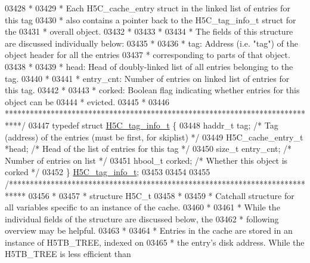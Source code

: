 \begin{DoxyCode}
03428 \textcolor{comment}{ *}
03429 \textcolor{comment}{ * Each H5C\_cache\_entry struct in the linked list of entries for this tag}
03430 \textcolor{comment}{ *      also contains a pointer back to the H5C\_tag\_info\_t struct for the}
03431 \textcolor{comment}{ *      overall object.}
03432 \textcolor{comment}{ *}
03433 \textcolor{comment}{ *}
03434 \textcolor{comment}{ * The fields of this structure are discussed individually below:}
03435 \textcolor{comment}{ *}
03436 \textcolor{comment}{ * tag: Address (i.e. "tag") of the object header for all the entries}
03437 \textcolor{comment}{ *              corresponding to parts of that object.}
03438 \textcolor{comment}{ *}
03439 \textcolor{comment}{ * head: Head of doubly-linked list of all entries belonging to the tag.}
03440 \textcolor{comment}{ *}
03441 \textcolor{comment}{ * entry\_cnt: Number of entries on linked list of entries for this tag.}
03442 \textcolor{comment}{ *}
03443 \textcolor{comment}{ * corked: Boolean flag indicating whether entries for this object can be}
03444 \textcolor{comment}{ *      evicted.}
03445 \textcolor{comment}{ *}
03446 \textcolor{comment}{ ****************************************************************************/}
03447 \textcolor{keyword}{typedef} \textcolor{keyword}{struct }\hyperlink{struct_h5_c__tag__info__t}{H5C\_tag\_info\_t} \{
03448     haddr\_t tag;                \textcolor{comment}{/* Tag (address) of the entries (must be first, for skiplist) */}
03449     H5C\_cache\_entry\_t *head;    \textcolor{comment}{/* Head of the list of entries for this tag */}
03450     \textcolor{keywordtype}{size\_t} entry\_cnt;           \textcolor{comment}{/* Number of entries on list */}
03451     hbool\_t corked;             \textcolor{comment}{/* Whether this object is corked */}
03452 \} \hyperlink{struct_h5_c__tag__info__t}{H5C\_tag\_info\_t};
03453 
03454 
03455 \textcolor{comment}{/****************************************************************************}
03456 \textcolor{comment}{ *}
03457 \textcolor{comment}{ * structure H5C\_t}
03458 \textcolor{comment}{ *}
03459 \textcolor{comment}{ * Catchall structure for all variables specific to an instance of the cache.}
03460 \textcolor{comment}{ *}
03461 \textcolor{comment}{ * While the individual fields of the structure are discussed below, the}
03462 \textcolor{comment}{ * following overview may be helpful.}
03463 \textcolor{comment}{ *}
03464 \textcolor{comment}{ * Entries in the cache are stored in an instance of H5TB\_TREE, indexed on}
03465 \textcolor{comment}{ * the entry's disk address.  While the H5TB\_TREE is less efficient than}

\end{DoxyCode}
